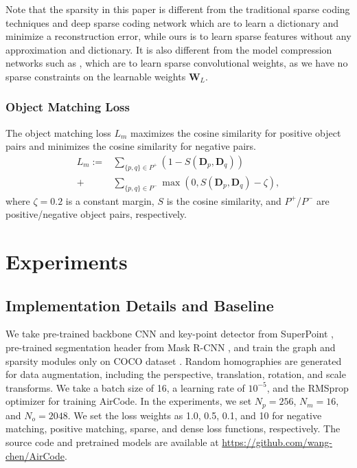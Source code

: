 \documentclass[letterpaper, 10 pt, journal, twoside]{IEEEtran}  %
\newcommand{\fix}[1]{#1}
\begin{document}
Note that the sparsity in this paper is different from the traditional sparse coding techniques \cite{lee2007efficient} and deep sparse coding network \cite{gwon2016deep} which are to learn a dictionary and minimize a reconstruction error, while ours is to learn sparse features without any approximation and dictionary.
It is also different from the model compression networks such as \cite{liu2020layerwise}, which are to learn sparse convolutional weights, as we have no sparse constraints on the learnable weights $\mathbf{W}_{L}$.


\subsubsection{Object Matching Loss}\label{sec:matching-loss}

The object matching loss $L_m$ maximizes the cosine similarity for positive object pairs and minimizes the cosine similarity for negative pairs.
\begin{equation}\label{eq:matching-loss}
    \begin{aligned}
         L_m :=& \sum_{\{p,q\}\in P^+} (1- S\left(\mathbf{D}_p,  \mathbf{D}_q\right))  \\
         +& \sum_{\{p,q\}\in P^-}\max (0,S(\mathbf{D}_p,  \mathbf{D}_q)-\zeta),
    \end{aligned}
\end{equation}
where $\zeta=0.2$ is a constant margin, $S$ is the cosine similarity, and $P^+$/$P^-$ are positive/negative object pairs, respectively.

\section{Experiments}

\subsection{Implementation Details and Baseline}

We take pre-trained backbone CNN and key-point detector from SuperPoint \cite{detone2018superpoint}, pre-trained segmentation header from Mask R-CNN \cite{he2017mask}, and \fix{train the graph and sparsity modules only on COCO dataset} \cite{lin2014microsoft}.
Random homographies are generated for data augmentation, including the perspective, translation, rotation, and scale transforms. We take a batch size of 16, a learning rate of $10^{-5}$, and the RMSprop \cite{hinton2012neural} optimizer for training AirCode.
In the experiments, we set $N_p= 256$, $N_m=16$, and $N_o=2048$.
We set the loss weights as 1.0, 0.5, 0.1, and 10 for negative matching, positive matching, sparse, and dense loss functions, respectively. The source code and pretrained models are available at \url{https://github.com/wang-chen/AirCode}.
\end{document}
